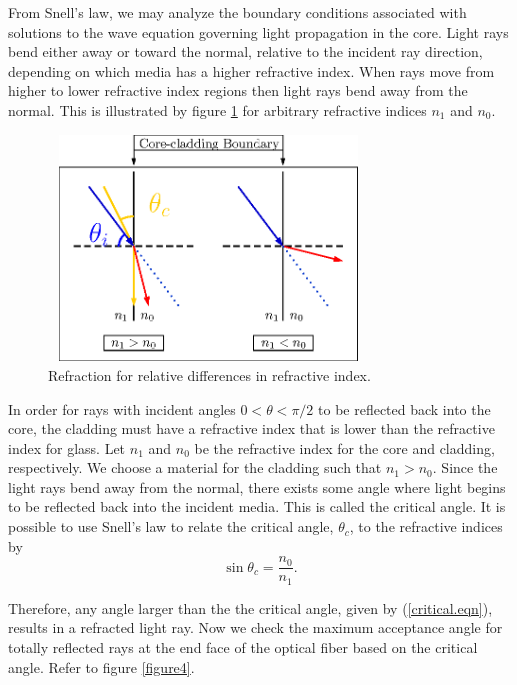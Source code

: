 \documentclass[12pt]{article}
\theoremstyle{definition}
\numberwithin{equation}{section}
\begin{document}
From Snell's law, we may analyze the boundary conditions associated with solutions to the wave equation governing light propagation in the core. Light rays bend either away or toward the normal, relative to the incident ray direction, depending on which media has a higher refractive index. When rays move from higher to lower refractive index regions then light rays bend away from the normal. This is illustrated by figure \ref{figure3} for arbitrary refractive indices $n_1$ and $n_0$.
\begin{figure}[h!]
\centerline{\includegraphics[height = 60mm, width=85mm, angle=0]{snell.eps}}
\caption{Refraction for relative differences in refractive index.}
\label{figure3}
\end{figure}

In order for rays with incident angles $0<\theta<\pi\slash 2$ to be reflected back into the core, the cladding must have a refractive index that is lower than the refractive index for glass. Let $n_1$ and $n_0$ be the refractive index for the core and cladding, respectively. We choose a material for the cladding such that $n_1>n_0$. Since the light rays bend away from the normal, there exists some angle where light begins to be reflected back into the incident media. This is called the critical angle. It is possible to use Snell's law to relate the critical angle, $\theta_c$, to the refractive indices by
\begin{equation}
\sin{\theta_c}=\frac{n_0}{n_1}.
\label{critical.eqn}
\end{equation}

Therefore, any angle larger than the the critical angle, given by (\ref{critical.eqn}), results in a refracted light ray. Now we check the maximum acceptance angle for totally reflected rays at the end face of the optical fiber based on the critical angle. Refer to figure \ref{figure4}.
\end{document}
